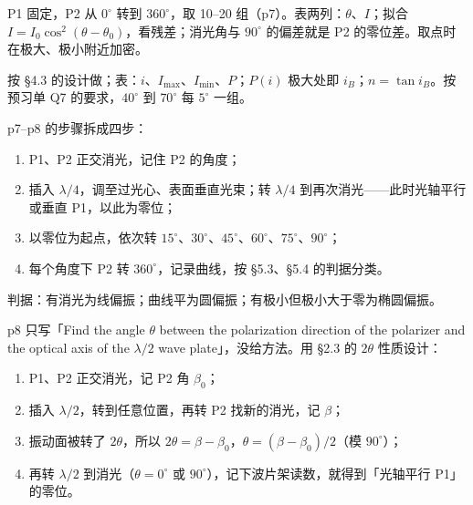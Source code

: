 \documentclass[11pt]{ctexart}
\begin{document}

P1 固定，P2 从 $0^\circ$ 转到 $360^\circ$，取 10--20 组（p7）。表两列：$\theta$、$I$；拟合 $I=I_0\cos^2(\theta-\theta_0)$，看残差；消光角与 $90^\circ$ 的偏差就是 P2 的零位差。取点时在极大、极小附近加密。


按 §4.3 的设计做；表：$i$、$I_{\max}$、$I_{\min}$、$P$；$P(i)$ 极大处即 $i_B$；$n=\tan i_B$。按预习单 Q7 的要求，$40^\circ$ 到 $70^\circ$ 每 $5^\circ$ 一组。


p7--p8 的步骤拆成四步：

\begin{enumerate}
\item P1、P2 正交消光，记住 P2 的角度；
\item 插入 $\lambda/4$，调至过光心、表面垂直光束；转 $\lambda/4$ 到再次消光——此时光轴平行或垂直 P1，以此为零位；
\item 以零位为起点，依次转 $15^\circ$、$30^\circ$、$45^\circ$、$60^\circ$、$75^\circ$、$90^\circ$；
\item 每个角度下 P2 转 $360^\circ$，记录曲线，按 §5.3、§5.4 的判据分类。
\end{enumerate}

判据：有消光为线偏振；曲线平为圆偏振；有极小但极小大于零为椭圆偏振。


p8 只写「Find the angle $\theta$ between the polarization direction of the polarizer and the optical axis of the $\lambda/2$ wave plate」，没给方法。用 §2.3 的 $2\theta$ 性质设计：

\begin{enumerate}
\item P1、P2 正交消光，记 P2 角 $\beta_0$；
\item 插入 $\lambda/2$，转到任意位置，再转 P2 找新的消光，记 $\beta$；
\item 振动面被转了 $2\theta$，所以 $2\theta=\beta-\beta_0$，$\theta=(\beta-\beta_0)/2$（模 $90^\circ$）；
\item 再转 $\lambda/2$ 到消光（$\theta=0^\circ$ 或 $90^\circ$），记下波片架读数，就得到「光轴平行 P1」的零位。
\end{enumerate}

\end{document}
